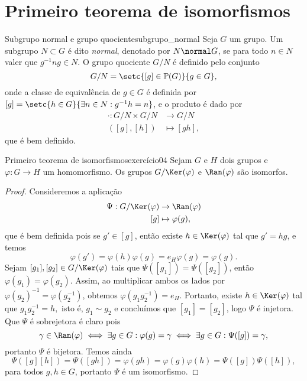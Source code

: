 \section{Primeiro teorema de isomorfismos}
\begin{definition}{Subgrupo normal e grupo quociente}{subgrupo_normal}
    Seja \(G\) um grupo. Um subgrupo \(N \subset G\) é dito \emph{normal}, denotado por \(N \normal G\), se para todo \(n \in N\) valer que \(g^{-1} n g \in N\). O grupo quociente \(G/N\) é definido pelo conjunto
    \begin{equation*}
        G / N = \setc{[g] \in \mathbb{P}(G)}{g \in G},
    \end{equation*}
    onde a classe de equivalência de \(g \in G\) é definida por \([g] = \setc{h \in G}{\exists n \in N : g^{-1}h = n}\), e o produto é dado por
    \begin{align*}
        \cdot : G/N \times G/N &\to G/N\\
                     ([g],[h]) &\mapsto [g h],
    \end{align*}
    que é bem definido.
\end{definition}
\begin{proposition}{Primeiro teorema de isomorfismos}{exercício04}
    Sejam \(G\) e \(H\) dois grupos e \(\varphi : G \to H\) um homomorfismo. Os grupos \(G/\Ker(\varphi)\) e \(\Ran(\varphi)\) são isomorfos.
\end{proposition}
\begin{proof}
    Consideremos a aplicação
    \begin{align*}
        \Psi : G/\Ker(\varphi) &\to \Ran(\varphi)\\
                           [g] &\mapsto \varphi(g),
    \end{align*}
    que é bem definida pois se \(g' \in [g]\), então existe \(h \in \Ker(\varphi)\) tal que \(g' = h g\), e temos
    \begin{equation*}
        \varphi(g') = \varphi(h)\varphi(g) = e_H\varphi(g) = \varphi(g).
    \end{equation*}
    Sejam \([g_1], [g_2] \in G/\Ker(\varphi)\) tais que \(\Psi([g_1]) = \Psi([g_2])\), então \(\varphi(g_1) = \varphi(g_2)\). Assim, ao multiplicar ambos os lados por \(\varphi(g_2)^{-1} = \varphi(g_2^{-1})\), obtemos \(\varphi(g_1 g_2^{-1}) = e_H\). Portanto, existe \(h \in \Ker(\varphi)\) tal que \(g_1 g_2^{-1} = h,\) isto é, \(g_1 \sim g_2\) e concluímos que \([g_1] = [g_2]\), logo \(\Psi\) é injetora. Que \(\Psi\) é sobrejetora é claro pois
    \begin{equation*}
        \gamma \in \Ran(\varphi) \iff \exists g \in G : \varphi(g) = \gamma \iff \exists g \in G : \Psi([g]) = \gamma,
    \end{equation*}
    portanto \(\Psi\) é bijetora. Temos ainda
    \begin{equation*}
        \Psi([g][h]) = \Psi([gh]) = \varphi(gh) = \varphi(g)\varphi(h) = \Psi([g])\Psi([h]),
    \end{equation*}
    para todos \(g, h \in G\), portanto \(\Psi\) é um isomorfismo.
\end{proof}
